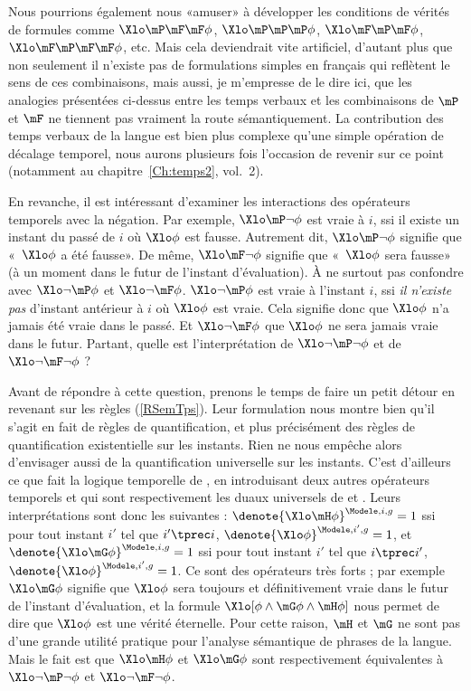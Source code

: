 Nous pourrions également nous «amuser» à développer les conditions de vérités de formules comme  $\Xlo\mP\mF\mF\phi$, $\Xlo\mP\mP\mP\phi$,
$\Xlo\mF\mP\mF\phi$, $\Xlo\mF\mP\mF\mF\phi$, etc.  
Mais cela deviendrait vite artificiel, d'autant plus que non seulement 
il n'existe pas de formulations simples en français qui reflètent le sens de ces combinaisons, mais aussi, je m'empresse de le dire ici, que les analogies présentées ci-dessus entre les temps verbaux et les combinaisons de $\mP$ et $\mF$ ne tiennent pas vraiment la route sémantiquement. La contribution des temps verbaux de la langue est bien plus complexe qu'une simple opération de décalage temporel, nous aurons plusieurs fois l'occasion de revenir sur ce point (notamment au chapitre~\ref{Ch:temps2}, vol.~2).

\label{negPF}
En revanche, il est intéressant d'examiner les interactions des opérateurs temporels avec la négation. 
Par exemple, $\Xlo\mP\neg\phi$ est vraie à $i$, ssi il existe un instant du passé de $i$ où $\Xlo\phi$ est fausse. 
Autrement dit, $\Xlo\mP\neg\phi$ signifie que «~$\Xlo\phi$ a été fausse».
De même,  $\Xlo\mF\neg\phi$ signifie que «~$\Xlo\phi$ sera fausse» (à un moment dans le futur de l'instant d'évaluation).  
À ne surtout pas confondre avec $\Xlo\neg\mP\phi$ et $\Xlo\neg\mF\phi$. 
$\Xlo\neg\mP\phi$ est vraie à l'instant $i$, ssi \emph{il n'existe pas} d'instant antérieur à $i$ où $\Xlo\phi$ est vraie. Cela signifie donc que $\Xlo\phi$ n'a jamais été vraie dans le passé. Et $\Xlo\neg\mF\phi$ que $\Xlo\phi$ ne sera jamais vraie dans le futur.
Partant, quelle est l'interprétation de $\Xlo\neg\mP\neg\phi$ et de $\Xlo\neg\mF\neg\phi$ ?

Avant de répondre à cette question, prenons le temps de faire un petit détour en revenant sur les règles (\RSem\ref{RSemTps}).  Leur formulation nous montre bien qu'il s'agit en fait de règles de quantification, et plus précisément des règles de quantification existentielle sur les instants. Rien ne nous empêche alors d'envisager aussi de la quantification universelle sur les instants. C'est d'ailleurs ce que fait la logique temporelle de \citet{Prior:67}, en introduisant deux autres opérateurs temporels {\mH} et {\mG} qui sont respectivement les duaux universels de {\mP} et {\mF}. Leurs interprétations sont donc les suivantes : \(\denote{\Xlo\mH\phi}^{\Modele,i,g}=1\) ssi pour tout instant $i'$ tel que $i'\tprec i$, \(\denote{\Xlo\phi}^{\Modele,i',g}=1\), et 
\(\denote{\Xlo\mG\phi}^{\Modele,i,g}=1\) ssi pour tout instant $i'$ tel que $i\tprec i'$, \(\denote{\Xlo\phi}^{\Modele,i',g}=1\).
Ce sont des opérateurs très forts ; par exemple $\Xlo\mG\phi$ signifie que $\Xlo\phi$ sera toujours et définitivement vraie dans le futur de l'instant d'évaluation, et la formule $\Xlo[\phi \wedge \mG\phi \wedge \mH\phi]$ nous permet de dire que $\Xlo\phi$ est une vérité éternelle.  Pour cette raison, $\mH$ et $\mG$ ne sont pas d'une grande utilité pratique pour l'analyse sémantique de phrases de la langue. Mais le fait est que $\Xlo\mH\phi$ et $\Xlo\mG\phi$ sont respectivement équivalentes à $\Xlo\neg\mP\neg\phi$ et $\Xlo\neg\mF\neg\phi$.


